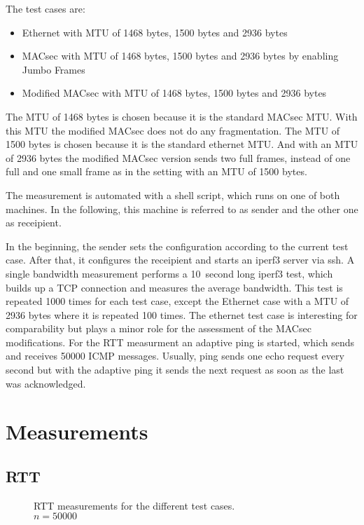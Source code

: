 The test cases are:
\begin{itemize}
  \item Ethernet with \gls{MTU} of 1468 bytes, 1500 bytes and 2936 bytes
  \item \gls{MACsec} with \gls{MTU} of 1468 bytes, 1500 bytes and 2936 bytes by enabling Jumbo Frames
  \item Modified \gls{MACsec} with \gls{MTU} of 1468 bytes, 1500 bytes and 2936 bytes
\end{itemize}

The \gls{MTU} of 1468 bytes is chosen because it is the standard \gls{MACsec} \gls{MTU}.
With this \gls{MTU} the modified \gls{MACsec} does not do any fragmentation.
The \gls{MTU} of 1500 bytes is chosen because it is the standard ethernet \gls{MTU}.
And with an \gls{MTU} of 2936 bytes the modified \gls{MACsec} version sends two full frames, instead of one full and one small frame as in the setting with an \gls{MTU} of 1500 bytes.

The measurement is automated with a shell script, which runs on one of both machines.
In the following, this machine is referred to as sender and the other one as receipient.

In the beginning, the sender sets the configuration according to the current test case.
After that, it configures the receipient and starts an iperf3 server via ssh.
A single bandwidth measurement performs a 10~second long iperf3 test, which builds up a \gls{TCP} connection and measures the average bandwidth.
This test is repeated 1000 times for each test case, except the Ethernet case with a \gls{MTU} of 2936 bytes where it is repeated 100 times.
The ethernet test case is interesting for comparability but plays a minor role for the assessment of the \gls{MACsec} modifications.
For the \gls{RTT} measurment an adaptive ping is started, which sends and receives 50000 \gls{ICMP} messages.
Usually, ping sends one echo request every second but with the adaptive ping it sends the next request as soon as the last was acknowledged.

\section{Measurements}
\subsection{\acrlong{RTT}}
\begin{figure}
    \centering
    \def\svgwidth{\columnwidth}
    
    \caption[\acrlong{RTT} experiment]{\gls{RTT} measurements for the different test cases.\\$n=50000$}
    \label{fig:rtt-test}
\end{figure}

